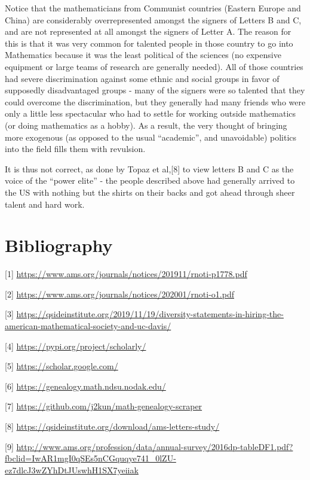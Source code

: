 \documentclass[]{article}
\begin{document}
Notice that the mathematicians from Communist countries (Eastern Europe
and China) are considerably overrepresented amongst the signers of
Letters B and C, and are not represented at all amongst the signers of
Letter A. The reason for this is that it was very common for talented
people in those country to go into Mathematics because it was the least
political of the sciences (no expensive equipment or large teams of
research are generally needed). All of those countries had severe
discrimination against some ethnic and social groups in favor of
supposedly disadvantaged groups - many of the signers were so talented
that they could overcome the discrimination, but they generally had many
friends who were only a little less spectacular who had to settle for
working outside mathematics (or doing mathematics as a hobby). As a
result, the very thought of bringing more exogenous (as opposed to the
usual ``academic'', and unavoidable) politics into the field fills them
with revulsion.

It is thus not correct, as done by Topaz et al,{[}8{]} to view letters B
and C as the voice of the ``power elite'' - the people described above
had generally arrived to the US with nothing but the shirts on their
backs and got ahead through sheer talent and hard work.

\hypertarget{bibliography}{%
\section{Bibliography}\label{bibliography}}

{[}1{]}
\url{https://www.ams.org/journals/notices/201911/rnoti-p1778.pdf}

{[}2{]} \url{https://www.ams.org/journals/notices/202001/rnoti-o1.pdf}

{[}3{]}
\url{https://qsideinstitute.org/2019/11/19/diversity-statements-in-hiring-the-american-mathematical-society-and-uc-davis/}

{[}4{]} \url{https://pypi.org/project/scholarly/}

{[}5{]} \url{https://scholar.google.com/}

{[}6{]} \url{https://genealogy.math.ndsu.nodak.edu/}

{[}7{]} \url{https://github.com/j2kun/math-genealogy-scraper}

{[}8{]} \url{https://qsideinstitute.org/download/ams-letters-study/}

{[}9{]}
\url{http://www.ams.org/profession/data/annual-survey/2016dp-tableDF1.pdf?fbclid=IwAR1mgI0qSEs5nCGquqye741_0lZU-ez7dlcJ3wZYhDtJUswhH1SX7yeiiak}
\end{document}

